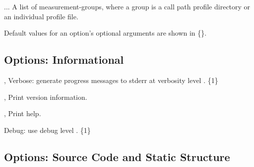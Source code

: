 \documentclass[english]{article}
\begin{document}
\begin{Description}
\item[\Arg{measurement-group}...] A list of measurement-groups, where a group is a call path profile directory or an individual profile file.
\end{Description}

Default values for an option's optional arguments are shown in \{\}.

\subsection{Options: Informational}

\begin{Description}
\item[\OptoArg{-v}{n}, \OptoArg{--verbose}{n}]
Verbose: generate progress messages to stderr at verbosity level .  \{1\} 
\item[\Opt{-V}, \Opt{--version}]
Print version information.

\item[\Opt{-h}, \Opt{--help}]
Print help.

\item[\OptoArg{--debug}{n}]
Debug: use debug level . \{1\}
\end{Description}

\subsection{Options: Source Code and Static Structure}
\end{document}
